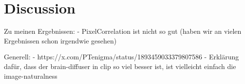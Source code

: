 \chapter{Discussion}


Zu meinen Ergebnissen:
- PixelCorrelation ist nicht so gut (haben wir an vielen Ergebnissen schon irgendwie gesehen)


Generell:
- https://x.com/PTenigma/status/1893459033379807586
- Erklärung dafür, dass der brain-diffuser in clip so viel besser ist, ist vielleicht einfach die image-naturalness
